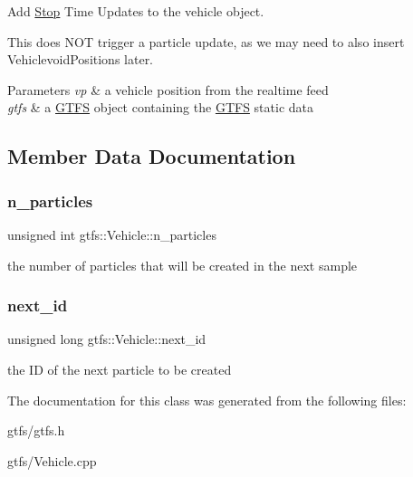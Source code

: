 Add \hyperlink{classgtfs_1_1Stop}{Stop} Time Updates to the vehicle object.

This does N\+OT trigger a particle update, as we may need to also insert Vehiclevoid\+Positions later.


\begin{DoxyParams}{Parameters}
{\em vp} & a vehicle position from the realtime feed \\
\hline
{\em gtfs} & a \hyperlink{classgtfs_1_1GTFS}{G\+T\+FS} object containing the \hyperlink{classgtfs_1_1GTFS}{G\+T\+FS} static data \\
\hline
\end{DoxyParams}


\subsection{Member Data Documentation}
\mbox{\label{classgtfs_1_1Vehicle_aa21babc8423abf92bbdf5e0748444f44}} 
\subsubsection{\texorpdfstring{n\+\_\+particles}{n\_particles}}
{\footnotesize\ttfamily unsigned int gtfs\+::\+Vehicle\+::n\+\_\+particles}

the number of particles that will be created in the next sample \mbox{\label{classgtfs_1_1Vehicle_aab535dd9953f9650e2adc351965779b1}} 
\subsubsection{\texorpdfstring{next\+\_\+id}{next\_id}}
{\footnotesize\ttfamily unsigned long gtfs\+::\+Vehicle\+::next\+\_\+id}

the ID of the next particle to be created 

The documentation for this class was generated from the following files\+:\begin{DoxyCompactItemize}
\item 
gtfs/gtfs.\+h\item 
gtfs/Vehicle.\+cpp\end{DoxyCompactItemize}
